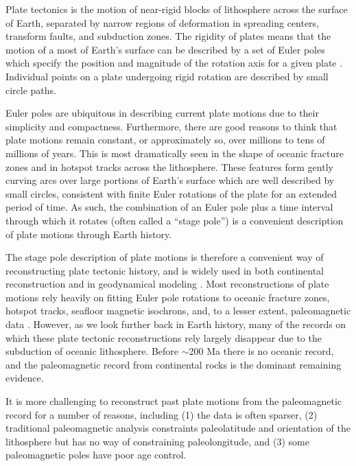\documentclass[preprint,12pt,authoryear]{elsarticle}
\begin{document}
Plate tectonics is the motion of near-rigid blocks of lithosphere across the surface of Earth, 
separated by narrow regions of deformation in spreading centers, transform faults, and subduction zones.
The rigidity of plates means that the motion of a most of Earth's surface
can be described by a set of Euler poles which specify the position and magnitude of the rotation axis for a
given plate \citep[cf.][]{cox2009plate}. Individual points on a plate undergoing
rigid rotation are described by small circle paths.

Euler poles are ubiquitous in describing current plate motions 
\citep[e.g.][]{demets1990current, argus2011geologically} due to their simplicity and compactness.
Furthermore, there are good reasons to think that plate motions remain constant, or approximately
so, over millions to tens of millions of years. This is most dramatically seen in the shape
of oceanic fracture zones and in hotspot tracks across the lithosphere. These features
form gently curving arcs over large portions of Earth's surface which are well described by small
circles, consistent with finite Euler rotations of the plate for an extended period of time.
As such, the combination of an Euler pole plus a time interval through which it rotates 
(often called a ``stage pole'') is a convenient description of plate motions through Earth history.

The stage pole description of plate motions is therefore a convenient way of reconstructing
plate tectonic history, and is widely used in both continental reconstruction 
\citep[e.g.][]{boyden2011next} and in geodynamical
modeling \citep[e.g.][]{mcnamara2005thermochemical, bull2014effect, rudolph2014history}.
Most reconstructions of plate motions rely heavily on fitting Euler pole rotations
to oceanic fracture zones, hotspot tracks, seafloor magnetic isochrons,
and, to a lesser extent, paleomagnetic data \citep{muller1993revised, seton2012global}.
However, as we look further back in Earth history, many of the records on which these
plate tectonic reconstructions rely largely disappear due to the 
subduction of oceanic lithosphere. Before $\sim$200 Ma there is no oceanic record,
and the paleomagnetic record from continental rocks is the dominant remaining evidence.

It is more challenging to reconstruct past plate motions from the paleomagnetic
record for a number of reasons, including 
(1) the data is often sparser,
(2) traditional paleomagnetic analysis constraints paleolatitude and orientation
of the lithosphere but has no way of constraining paleolongitude, and
(3) some paleomagnetic poles have poor age control.
\end{document}
